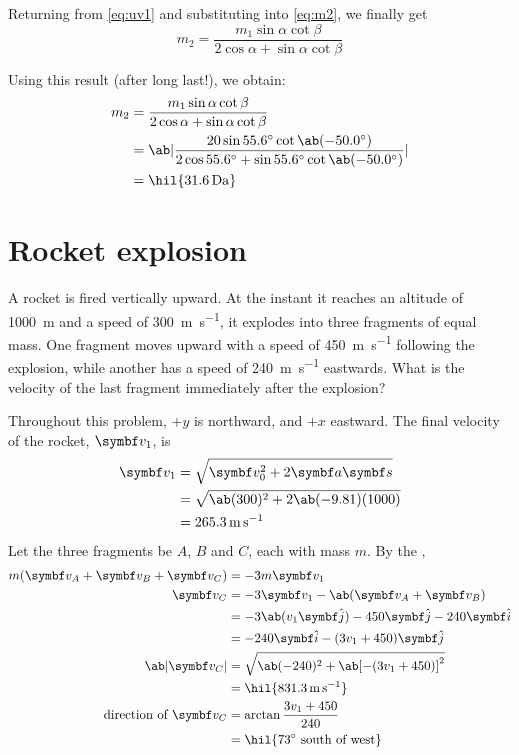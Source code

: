 Returning from \cref{eq:uv1} and substituting into \cref{eq:m2}, we
finally get
\begin{equation}
  m_2 = \dfrac{m_1\sin\alpha\cot\beta}{2\cos\alpha + \sin\alpha\cot\beta}
\end{equation}

Using this result (after long last!), we obtain:
\begin{align*}
  m_2 &= \dfrac{m_1\sin\alpha\cot\beta}{2\cos\alpha + \sin\alpha\cot\beta} \\
  &=
  \ab|\frac{20\sin\qty{55.6}{\degree}\cot\ab(\qty{-50.0}{\degree})}{2\cos\qty{55.6}{\degree}
  + \sin\qty{55.6}{\degree}\cot\ab(\qty{-50.0}{\degree})}| \\
  &= \hil{\qty{31.6}{\dalton}}
\end{align*}

\section{Rocket explosion}
\begin{problem}
  A rocket is fired vertically upward. At the instant it reaches an
  altitude of \qty{1000}{\metre} and a
  speed of \qty{300}{\metre\per\second}, it explodes into three
  fragments of equal mass. One fragment moves
  upward with a speed of \qty{450}{\metre\per\second} following the
  explosion, while another has a speed of
  \qty{240}{\metre\per\second} eastwards. What is the velocity of the
  last fragment immediately after the explosion?
\end{problem}

Throughout this problem, \(+y\) is northward, and \(+x\) eastward.
The final velocity of the rocket, \(\mv{v}_1\), is
\begin{align*}
  \mv{v}_1 &= \sqrt{\mv{v}_0^2 + 2\mv{a}\mv{s}}\\
  &= \sqrt{\ab(300)^2 + 2\ab(-9.81)(1000)} \\
  &= \qty{265.3}{\metre\per\second}
\end{align*}
Let the three fragments be \(A\), \(B\) and \(C\), each with mass
\(m\). By the ,
\begin{align*}
  m(\mv{v}_A + \mv{v}_B + \mv{v}_C) &= -3m\mv{v}_1 \\
  \mv{v}_C &= -3\mv{v}_1 - \ab(\mv{v}_A + \mv{v}_B) \\
  &= -3\ab(v_1\jj) - 450\jj - 240\ii \\
  &= -240\ii - (3v_1 + 450)\jj \\
  \ab|\mv{v}_C| &= \sqrt{\ab(-240)^2 + \ab[-(3v_1+450)]^2}\\
  &= \hil{\qty{831.3}{\metre\per\second}} \\
  \text{direction of } \mv{v}_C &= \arctan\f{3v_1 +450}{240} \\
  &= \hil{\qty{73}{\degree}\text{ south of west}}
\end{align*}

